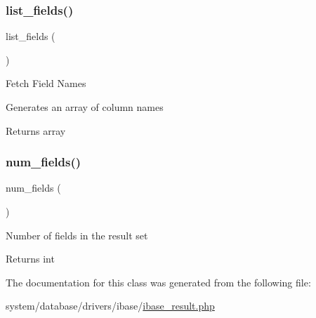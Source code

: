 \subsubsection{\texorpdfstring{list\+\_\+fields()}{list\_fields()}}
{\footnotesize\ttfamily list\+\_\+fields (\begin{DoxyParamCaption}{ }\end{DoxyParamCaption})}

Fetch Field Names

Generates an array of column names

\begin{DoxyReturn}{Returns}
array 
\end{DoxyReturn}
\mbox{\label{class_c_i___d_b__ibase__result_af831bf363e4d7d661a717a4932af449d}} 
\subsubsection{\texorpdfstring{num\+\_\+fields()}{num\_fields()}}
{\footnotesize\ttfamily num\+\_\+fields (\begin{DoxyParamCaption}{ }\end{DoxyParamCaption})}

Number of fields in the result set

\begin{DoxyReturn}{Returns}
int 
\end{DoxyReturn}


The documentation for this class was generated from the following file\+:\begin{DoxyCompactItemize}
\item 
system/database/drivers/ibase/\mbox{\hyperlink{ibase__result_8php}{ibase\+\_\+result.\+php}}\end{DoxyCompactItemize}

